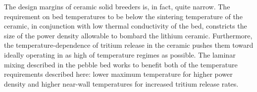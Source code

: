 The design margins of ceramic solid breeders is, in fact, quite narrow. The requirement on bed temperatures to be below the sintering temperature of the ceramic, in conjunction with low thermal conductivity of the bed, constricts the size of the power density allowable to bombard the lithium ceramic. Furthermore, the temperature-dependence of tritium release in the ceramic pushes them toward ideally operating in as high of temperature regimes as possible. The laminar mixing described in the pebble bed works to benefit both of the temperature requirements described here: lower maximum temperature for higher power density and higher near-wall temperatures for increased tritium release rates.